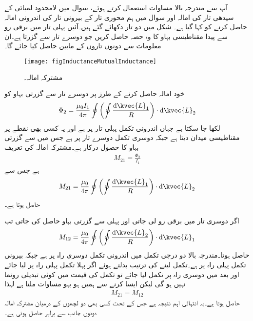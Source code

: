 آپ سے مندرجہ بالا مساوات استعمال کرتے  ہوئے، سوال  میں لامحدود لمبائی کے سیدھی تار کی امالہ اور سوال  میں ہم محوری تار کے بیرونی تار کی اندرونی امالہ حاصل کرنے کو کہا گیا ہے۔
شکل  میں دو تار دکھائے گئے ہیں۔آئیں پہلی تار میں برقی رو  سے پیدا مقناطیسی بہاو کا وہ حصہ حاصل کریں جو  دوسرے تار سے گزرتا ہے۔ان معلومات سے دونوں تاروں  کے مابین  حاصل کیا جائے گا۔
\begin{figure}
\centering
\texttt{[image: figInductanceMutualInductance]}
\caption{مشترکہ امالہ۔}
\label{مساوات_امالہ_مشترکہ_امالہ}
\end{figure}
خود امالہ حاصل کرنے کے  طرز پر دوسرے تار سے گزرتی بہاو کو 
\begin{align*}
\Phi_{2} =\frac{\mu_0 I_1}{4\pi} \oint \left(\oint \frac{\dif \kvec{L}_1}{R} \right) \cdot \dif \kvec{L}_2
\end{align*}
لکھا جا سکتا ہے جہاں اندرونی تکمل پہلی تار پر ہے اور یہ کسی بھی نقطے پر مقناطیسی میدان دیتا ہے جبکہ دوسری تکمل دوسرے تار پر ہے جس میں سے گزرتی بہاو کا حصول درکار ہے۔مشترکہ امالہ  کی تعریف
\begin{align}
M_{21}=\frac{\Phi_2}{I_1}
\end{align}
ہے جس سے
\begin{align}\label{مساوات_امالہ_مشترکہ_الف}
M_{21}=\frac{\mu_0}{4\pi} \oint \left(\oint \frac{\dif \kvec{L}_1}{R} \right) \cdot \dif \kvec{L}_2
\end{align}
حاصل ہوتا ہے۔

اگر دوسری تار میں برقی رو لی جاتی اور پہلی سے گزرتی بہاو حاصل کی جاتی تب
\begin{align}
M_{12}=\frac{\mu_0}{4\pi} \oint \left(\oint \frac{\dif \kvec{L}_2}{R} \right) \cdot \dif \kvec{L}_1
\end{align}
حاصل ہوتا۔مندرجہ بالا دو درجی تکمل میں اندرونی تکمل دوسری راہ پر ہے جبکہ بیرونی تکمل پہلی راہ پر ہے۔تکمل لینے کی ترتیب بدلتے ہوئے اگر پہلا تکمل پہلی راہ پر لیا جائے اور بعد میں دوسری راہ پر تکمل لیا جائے تو تکمل کی قیمت میں کوئی تبدیلی رونما نہیں ہو گی لیکن ایسا کرنے سے ہمیں ہو بہو مساوات  ملتا ہے  لہٰذا 
\begin{align}
M_{21}=M_{12}
\end{align}
حاصل ہوتا ہے۔یہ انتہائی اہم نتیجہ ہے جس کے تحت کسی بھی دو لچھوں کے درمیان مشترکہ امالہ دونوں جانب سے برابر حاصل ہوتی ہے۔



